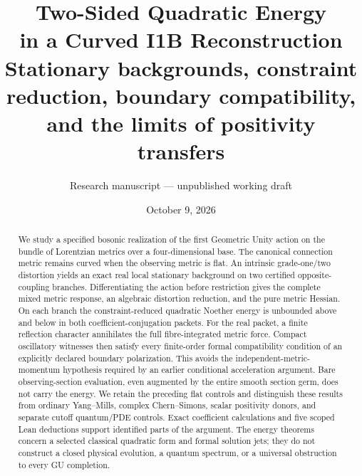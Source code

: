 \documentclass[11pt]{article}
\title{Two-Sided Quadratic Energy\\in a Curved I1B Reconstruction\\[0.5em]
\large Stationary backgrounds, constraint reduction, boundary compatibility,\\
and the limits of positivity transfers}
\author{Research manuscript --- unpublished working draft}
\date{October 9, 2026}
\theoremstyle{definition}
\theoremstyle{remark}
\begin{document}
\maketitle
\begin{abstract}
We study a specified bosonic realization of the first Geometric Unity action
on the bundle of Lorentzian metrics over a four-dimensional base. The
canonical connection metric remains curved when the observing metric is
flat. An intrinsic grade-one/two distortion yields an exact real local
stationary background on two certified opposite-coupling branches.
Differentiating the action before restriction gives the complete mixed
metric response, an algebraic distortion reduction, and the pure metric
Hessian. On each branch the constraint-reduced quadratic Noether energy
is unbounded above and below in both coefficient-conjugation packets.
For the real packet, a finite reflection character annihilates the full
fibre-integrated metric force. Compact oscillatory witnesses then satisfy
every finite-order formal compatibility condition of an explicitly declared
boundary polarization. This avoids the independent-metric-momentum
hypothesis required by an earlier conditional acceleration argument.
Bare observing-section evaluation, even augmented by the entire smooth
section germ, does not carry the energy. We retain the preceding flat
controls and distinguish these results from ordinary Yang--Mills,
complex Chern--Simons, scalar positivity donors, and separate cutoff
quantum/PDE controls. Exact coefficient calculations and five scoped Lean
deductions support identified parts of the argument. The energy theorems
concern a selected classical quadratic form and formal solution jets;
they do not construct a closed physical evolution, a quantum spectrum,
or a universal obstruction to every GU completion.
\end{abstract}
\clearpage
\begingroup\small
\tableofcontents
\endgroup
\clearpage





\clearpage
\begingroup\small\raggedright


\endgroup
\end{document}
